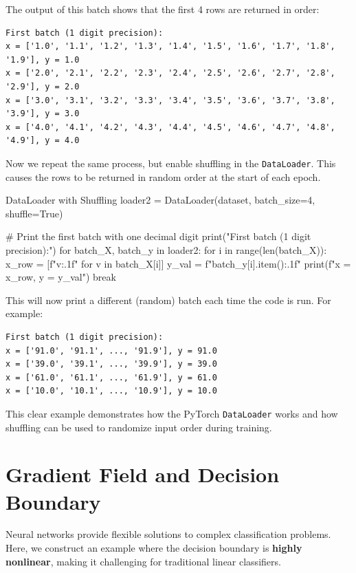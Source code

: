 The output of this batch shows that the first 4 rows are returned in order:

\begin{verbatim}
First batch (1 digit precision):
x = ['1.0', '1.1', '1.2', '1.3', '1.4', '1.5', '1.6', '1.7', '1.8', '1.9'], y = 1.0
x = ['2.0', '2.1', '2.2', '2.3', '2.4', '2.5', '2.6', '2.7', '2.8', '2.9'], y = 2.0
x = ['3.0', '3.1', '3.2', '3.3', '3.4', '3.5', '3.6', '3.7', '3.8', '3.9'], y = 3.0
x = ['4.0', '4.1', '4.2', '4.3', '4.4', '4.5', '4.6', '4.7', '4.8', '4.9'], y = 4.0
\end{verbatim}

Now we repeat the same process, but enable shuffling in the \texttt{DataLoader}. This causes the rows to be returned in random order at the start of each epoch.

\begin{codeonly}{DataLoader with Shuffling}
loader2 = DataLoader(dataset, batch_size=4, shuffle=True)

# Print the first batch with one decimal digit
print("First batch (1 digit precision):")
for batch_X, batch_y in loader2:
    for i in range(len(batch_X)):
        x_row = [f"{v:.1f}" for v in batch_X[i]]
        y_val = f"{batch_y[i].item():.1f}"
        print(f"x = {x_row}, y = {y_val}")
    break
\end{codeonly}

This will now print a different (random) batch each time the code is run. For example:

\begin{verbatim}
First batch (1 digit precision):
x = ['91.0', '91.1', ..., '91.9'], y = 91.0
x = ['39.0', '39.1', ..., '39.9'], y = 39.0
x = ['61.0', '61.1', ..., '61.9'], y = 61.0
x = ['10.0', '10.1', ..., '10.9'], y = 10.0
\end{verbatim}

This clear example demonstrates how the PyTorch \texttt{DataLoader} works and how shuffling can be used to randomize input order during training.



%
\section{Gradient Field and Decision Boundary}

Neural networks provide flexible solutions to complex classification problems. Here, we construct an example where the decision boundary is \textbf{highly nonlinear}, making it challenging for traditional linear classifiers. 

